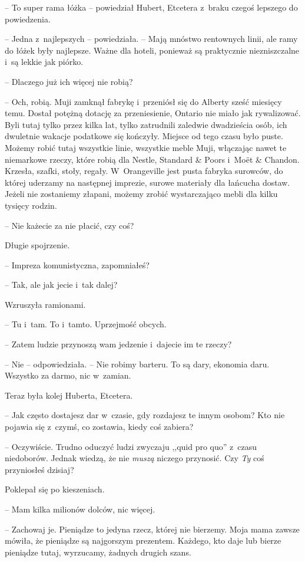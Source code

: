 \documentclass[oneside,polish,11pt,sfheadings]{mwbk}
\begin{document}
-- To super rama łóżka -- powiedział Hubert, Etcetera z~braku czegoś
lepszego do powiedzenia.

-- Jedna z~najlepszych -- powiedziała. -- Mają mnóstwo rentownych linii,
ale ramy do łóżek były najlepsze. Ważne dla hoteli, ponieważ są
praktycznie niezniszczalne i~są lekkie jak piórko.

-- Dlaczego już ich więcej nie robią?

-- Och, robią. Muji zamknął fabrykę i~przeniósł się do Alberty sześć
miesięcy temu. Dostał potężną dotację za przeniesienie, Ontario nie
miało jak rywalizować. Byli tutaj tylko przez kilka lat, tylko
zatrudnili zaledwie dwadzieścia osób, ich dwuletnie wakacje podatkowe
się kończyły. Miejsce od tego czasu było puste. Możemy robić tutaj
wszystkie linie, wszystkie meble Muji, włączając nawet te niemarkowe
rzeczy, które robią dla Nestle, Standard \& Poors i~Moët \& Chandon.
Krzesła, szafki, stoły, regały. W~Orangeville jest pusta fabryka
surowców, do której uderzamy na następnej imprezie, surowe materiały dla
łańcucha dostaw. Jeżeli nie zostaniemy złapani, możemy zrobić
wystarczająco mebli dla kilku tysięcy rodzin.

-- Nie każecie za nie płacić, czy coś?

Długie spojrzenie. 

-- Impreza komunistyczna, zapomniałeś?

-- Tak, ale jak jecie i~tak dalej?

Wzruszyła ramionami. 

-- Tu i~tam. To i~tamto. Uprzejmość obcych.

-- Zatem ludzie przynoszą wam jedzenie i~dajecie im te rzeczy?

-- Nie -- odpowiedziała. -- Nie robimy barteru. To są dary, ekonomia daru.
Wszystko za darmo, nic w~zamian.

Teraz była kolej Huberta, Etcetera. 

-- Jak często dostajesz dar w~czasie,
gdy rozdajesz te innym osobom? Kto nie pojawia się z~czymś, co zostawia,
kiedy coś zabiera?

-- Oczywiście. Trudno oduczyć ludzi zwyczaju ,,quid pro quo'' z~czasu
niedoborów. Jednak wiedzą, że nie \textit{muszą} niczego przynosić. Czy
\textit{Ty} coś przyniosłeś dzisiaj?

Poklepał się po kieszeniach. 

-- Mam kilka milionów dolców, nic więcej.

-- Zachowaj je. Pieniądze to jedyna rzecz, której nie bierzemy. Moja mama
zawsze mówiła, że pieniądze są najgorszym prezentem. Każdego, kto daje
lub bierze pieniądze tutaj, wyrzucamy, żadnych drugich szans.
\end{document}
